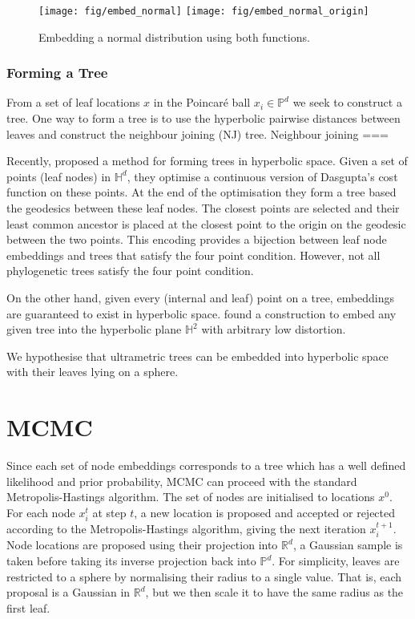 \documentclass[11pt, twocolumn]{article}
\begin{document}
\begin{figure}[ht]
    \centering
    \texttt{[image: fig/embed\_normal]}
    \texttt{[image: fig/embed\_normal\_origin]}
    \caption{Embedding a normal distribution using both functions.}
    \label{fig:maps}
\end{figure}


\subsubsection{Forming a Tree}
From a set of leaf locations $x$ in the Poincaré ball $x_i \in \mathbb{P}^d$ we seek to construct a tree.
One way to form a tree is to use the hyperbolic pairwise distances between leaves and construct the neighbour joining (NJ) tree.
Neighbour joining ===

Recently, \cite{chami2020trees} proposed a method for forming trees in hyperbolic space.
Given a set of points (leaf nodes) in $\mathbb{H}^{d}$, they optimise a continuous version of Dasgupta's cost function on these points.
At the end of the optimisation they form a tree based the geodesics between these leaf nodes.
The closest points are selected and their least common ancestor is placed at the closest point to the origin on the geodesic between the two points.
This encoding provides a bijection between leaf node embeddings and trees that satisfy the four point condition.
However, not all phylogenetic trees satisfy the four point condition.

On the other hand, given every (internal and leaf) point on a tree, embeddings are guaranteed to exist in hyperbolic space.
\cite{sarkar2012low} found a construction to embed any given tree into the hyperbolic plane $\mathbb{H}^{2}$ with arbitrary low distortion.


We hypothesise that ultrametric trees can be embedded into hyperbolic space with their leaves lying on a sphere.

\section{MCMC}
Since each set of node embeddings corresponds to a tree which has a well defined likelihood and prior probability, MCMC can proceed with the standard Metropolis-Hastings algorithm.
The set of nodes are initialised to locations $x^{0}$.
For each node $x_{i}^t$ at step $t$, a new location is proposed and accepted or rejected according to the Metropolis-Hastings algorithm, giving the next iteration $x_i^{t+1}$.
Node locations are proposed using their projection into $\mathbb{R}^d$, a Gaussian sample is taken before taking its inverse projection back into $\mathbb{P}^d$.
For simplicity, leaves are restricted to a sphere by normalising their radius to a single value.
That is, each proposal is a Gaussian in $\mathbb{R}^d$, but we then scale it to have the same radius as the first leaf.
\end{document}
